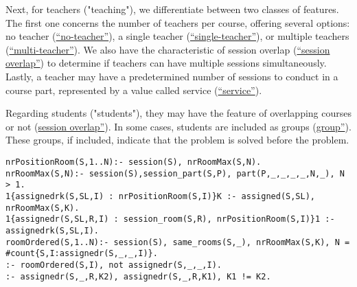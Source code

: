 %
Next, for teachers ("teaching"), we differentiate between two classes of features. The first one concerns the number of teachers per course, offering several options: no teacher (\hyperref[featmodel:noteacher]{``no-teacher''}), a single teacher (\hyperref[featmodel:singleteacher]{``single-teacher''}), or multiple teachers (\hyperref[featmodel:multiteacher]{``multi-teacher''}). We also have the characteristic of session overlap (\hyperref[featmodel:teacheroverlap]{``session overlap''}) to determine if teachers can have multiple sessions simultaneously. Lastly, a teacher may have a predetermined number of sessions to conduct in a course part, represented by a value called service (\hyperref[featmodel:service]{``service''}).

%
Regarding students ("students"), they may have the feature of overlapping courses or not (\hyperref[featmodel:groupoverlap]{session overlap''}). In some cases, students are included as groups (\hyperref[featmodel:group]{group''}). These groups, if included, indicate that the problem is solved before the \EDT{} problem.



\begin{lstlisting}[style=PrologStyle, caption={Multi-room ASP}, label={lst:multiroom-asp}]
nrPositionRoom(S,1..N):- session(S), nrRoomMax(S,N).
nrRoomMax(S,N):- session(S),session_part(S,P), part(P,_,_,_,_,N,_), N > 1.
1{assignedrk(S,SL,I) : nrPositionRoom(S,I)}K :- assigned(S,SL), nrRoomMax(S,K).
1{assignedr(S,SL,R,I) : session_room(S,R), nrPositionRoom(S,I)}1 :- assignedrk(S,SL,I).
roomOrdered(S,1..N):- session(S), same_rooms(S,_), nrRoomMax(S,K), N = #count{S,I:assignedr(S,_,_,I)}.
:- roomOrdered(S,I), not assignedr(S,_,_,I).
:- assignedr(S,_,R,K2), assignedr(S,_,R,K1), K1 != K2.
\end{lstlisting}


